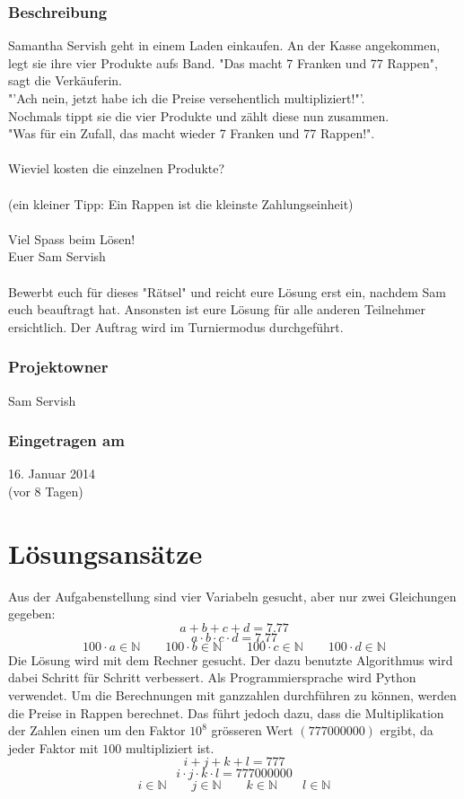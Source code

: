 \documentclass[10pt, fleqn]{article}
\begin{document}
\subsubsection*{Beschreibung}
Samantha Servish geht in einem Laden einkaufen. An der Kasse angekommen, legt 
sie ihre vier Produkte aufs Band. "Das macht 7 Franken und 77 Rappen", sagt 
die Verkäuferin. \\
"'Ach nein, jetzt habe ich die Preise versehentlich multipliziert!"'. \\
Nochmals tippt sie die vier Produkte und zählt diese nun zusammen. \\
"Was für ein Zufall, das macht wieder 7 Franken und 77 Rappen!". \\\\
%
Wieviel kosten die einzelnen Produkte? \\\\
%
(ein kleiner Tipp: Ein Rappen ist die kleinste Zahlungseinheit) \\\\
%
Viel Spass beim Lösen! \\
Euer Sam Servish \\\\
%
Bewerbt euch für dieses "Rätsel" und reicht eure Lösung erst ein, nachdem Sam 
euch beauftragt hat. Ansonsten ist eure Lösung für alle anderen Teilnehmer 
ersichtlich. Der Auftrag wird im Turniermodus durchgeführt. 

\subsubsection*{Projektowner}
Sam Servish 

\subsubsection*{Eingetragen am}
16. Januar 2014 \\
(vor 8 Tagen) 

\newpage

\section{Lösungsansätze}
Aus der Aufgabenstellung sind vier Variabeln gesucht, aber nur zwei Gleichungen 
gegeben: 
\[ a + b + c + d = 7.77 \]
\[ a \cdot b \cdot c \cdot d = 7.77 \]
\[ 100 \cdot a \in \mathbb{N} \qquad 100 \cdot b \in \mathbb{N} \qquad 
100 \cdot c \in \mathbb{N} \qquad 100 \cdot d \in \mathbb{N} \]
Die Lösung wird mit dem Rechner gesucht. Der dazu benutzte Algorithmus wird 
dabei Schritt für Schritt verbessert. Als Programmiersprache wird Python 
verwendet. Um die Berechnungen mit ganzzahlen durchführen zu können, werden 
die Preise in Rappen berechnet. Das führt jedoch dazu, dass die Multiplikation 
der Zahlen einen um den Faktor $10^8$ grösseren Wert $(777000000)$ ergibt, da 
jeder Faktor mit $100$ multipliziert ist. 
\[ i + j + k + l = 777 \]
\[ i \cdot j \cdot k \cdot l = 777000000 \]
\[ i \in \mathbb{N} \qquad j \in \mathbb{N} \qquad 
k \in \mathbb{N} \qquad l \in \mathbb{N} \]
\end{document}

